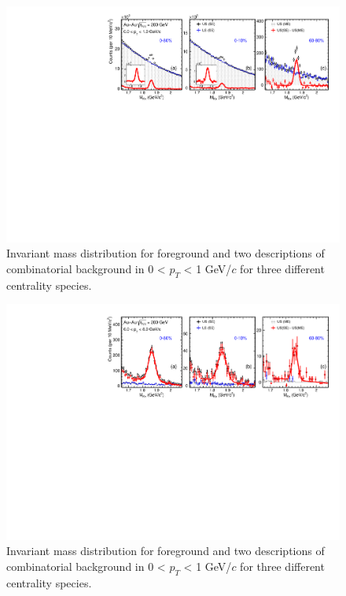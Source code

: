 \begin{figure}[htbp]
\centering
\includegraphics[keepaspectratio,width=1.0\textwidth]{figure/Run14_D0HFT/signal2_0_1GeV.pdf}
\caption{Invariant mass distribution for foreground and two descriptions of combinatorial background in 0 < $p_T$ < 1 GeV/$c$ for three different centrality species.}
\label{fig:mixedEvent_pt0_1}
\end{figure}

\begin{figure}[htbp]
\centering
\includegraphics[keepaspectratio,width=1.0\textwidth]{figure/Run14_D0HFT/signal_6_8GeV.pdf}
\caption{Invariant mass distribution for foreground and two descriptions of combinatorial background in 0 < $p_T$ < 1 GeV/$c$ for three different centrality species.}
\label{fig:mixedEvent_pt6_8}
\end{figure}

